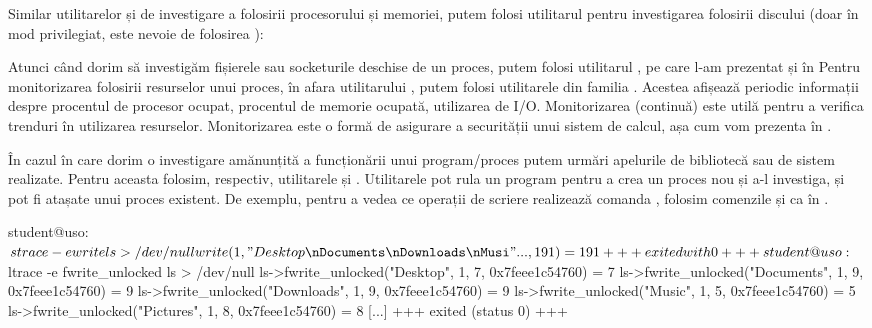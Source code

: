 Similar utilitarelor  și  de investigare a folosirii procesorului și memoriei, putem folosi utilitarul  pentru investigarea folosirii discului (doar în mod privilegiat, este nevoie de folosirea ):


Atunci când dorim să investigăm fișierele sau socketurile deschise de un proces, putem folosi utilitarul , pe care l-am prezentat și în  Pentru monitorizarea folosirii resurselor unui proces, în afara utilitarului , putem folosi utilitarele din familia .
Acestea afișează periodic informații despre procentul de procesor ocupat, procentul de memorie ocupată, utilizarea de I/O.
Monitorizarea (continuă) este utilă pentru a verifica trenduri în utilizarea resurselor.
Monitorizarea este o formă de asigurare a securității unui sistem de calcul, așa cum vom prezenta în .

În cazul în care dorim o investigare amănunțită a funcționării unui program/proces putem urmări apelurile de bibliotecă sau de sistem realizate.
Pentru aceasta folosim, respectiv, utilitarele  și .
Utilitarele pot rula un program pentru a crea un proces nou și a-l investiga, și pot fi atașate unui proces existent.
De exemplu, pentru a vedea ce operații de scriere realizează comanda , folosim comenzile  și  ca în .

\begin{screen}[caption={Investigarea apelurilor de sistem și de blbliotecă},label={lst:process:trace}]
student@uso:~$ strace -e write ls > /dev/null
write(1, "Desktop\nDocuments\nDownloads\nMusi"..., 191) = 191
+++ exited with 0 +++
student@uso:~$ ltrace -e fwrite_unlocked ls > /dev/null
ls->fwrite_unlocked("Desktop", 1, 7, 0x7feee1c54760)                                                          = 7
ls->fwrite_unlocked("Documents", 1, 9, 0x7feee1c54760)                                                        = 9
ls->fwrite_unlocked("Downloads", 1, 9, 0x7feee1c54760)                                                        = 9
ls->fwrite_unlocked("Music", 1, 5, 0x7feee1c54760)                                                            = 5
ls->fwrite_unlocked("Pictures", 1, 8, 0x7feee1c54760)                                                         = 8
[...]
+++ exited (status 0) +++
\end{screen}

